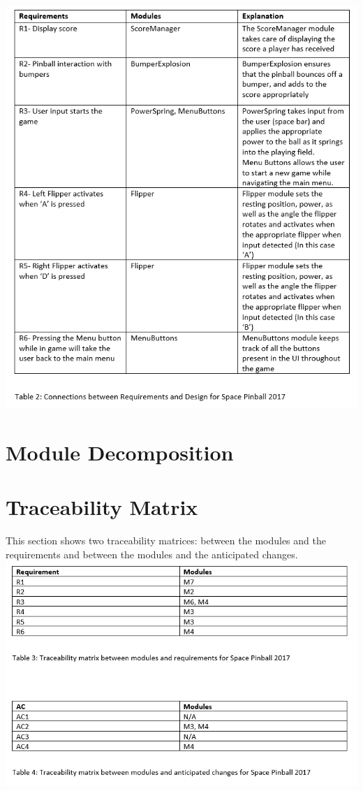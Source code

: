 \documentclass[12pt, titlepage]{article}
\begin{document}
\includegraphics[scale=0.9]{2.png}

\section{Module Decomposition} \label{SecMD}


\section{Traceability Matrix} \label{SecTM}

This section shows two traceability matrices: between the modules and the
requirements and between the modules and the anticipated changes.\\

\includegraphics[scale=0.9]{3.png}
\end{document}
